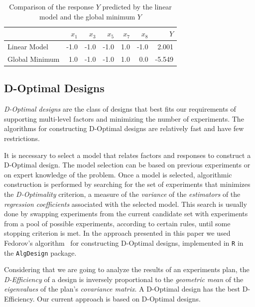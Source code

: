 \documentclass[conference]{IEEEtran}
\begin{document}
\begin{table}[ht]
\centering
\caption{Comparison of the response $Y$ predicted by the linear model and the global minimum $Y$}
\begingroup\footnotesize
\begin{tabular}{lrrrrrr}
  \toprule
 & $x_1$ & $x_3$ & $x_5$ & $x_7$ & $x_8$ & $Y$ \\
  \midrule
Linear Model & -1.0 & -1.0 & -1.0 & 1.0 & -1.0 & 2.001 \\
  Global Minimum & 1.0 & -1.0 & -1.0 & 1.0 & 0.0 & -5.549 \\
   \bottomrule
\end{tabular}
\endgroup
\end{table}
\subsection{D-Optimal Designs}
\label{sec:orgaebd2a0}
\emph{D-Optimal designs} are the class of designs that best fits our requirements of
supporting multi-level factors and minimizing the number of experiments. The
algorithms for constructing D-Optimal designs are relatively fast and have few
restrictions.

It is necessary to select a model that relates factors and responses to
construct a D-Optimal design. The model selection can be based on previous
experiments or on expert knowledge of the problem. Once a model is selected,
algorithmic construction is performed by searching for the set of experiments
that minimizes the \emph{D-Optimality} criterion, a measure of the \emph{variance} of the
\emph{estimators} of the \emph{regression coefficients} associated with the selected
model. This search is usually done by swapping experiments from the current
candidate set with experiments from a pool of possible experiments, according to
certain rules, until some stopping criterion is met. In the approach presented
in this paper we used Fedorov's algorithm~\cite{fedorov1972theory} for
constructing D-Optimal designs, implemented in \texttt{R} in the \texttt{AlgDesign} package.

Considering that we are going to analyze the results of an experiments plan, the
\emph{D-Efficiency} of a design is inversely proportional to the \emph{geometric mean} of
the \emph{eigenvalues} of the plan's \emph{covariance matrix}. A D-Optimal design has the
best D-Efficiency. Our current approach is based on D-Optimal designs.
\end{document}
